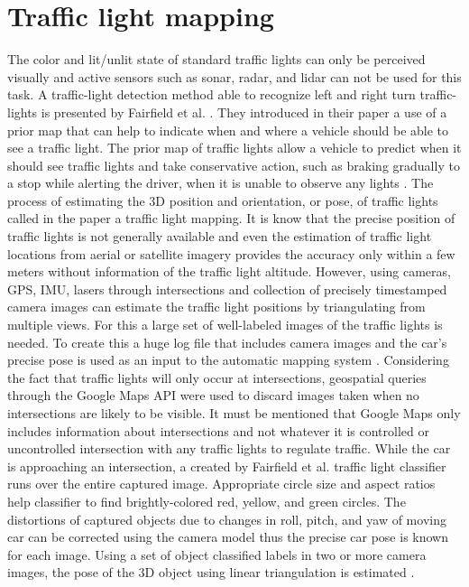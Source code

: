 \documentclass[letterpaper, 10 pt, conference]{ieeeconf} %
\begin{document}


\section{Traffic light mapping}
The color and lit/unlit state of standard traffic lights can only be perceived visually and active sensors such as sonar, radar, and lidar can not be used for this task. A traffic-light detection method able to recognize left and right turn traffic-lights is presented by Fairfield et al. \cite{c5}. They introduced in their paper a use of a prior map that can help to indicate when and where a vehicle should be able to see a traffic light. The prior map of traffic lights allow a vehicle to predict when it should see traffic lights and take conservative action, such as braking gradually to a stop while alerting the driver, when it is unable to observe any lights \cite{c5}. The process of estimating the 3D position and orientation, or pose, of traffic lights called in the paper a traffic light mapping. It is know that the precise position of traffic lights is not generally available and even the estimation of traffic light locations from aerial or satellite imagery provides the accuracy only within a few meters without information of the traffic light altitude. However, using cameras, GPS, IMU, lasers through intersections and collection of precisely timestamped camera images can estimate the traffic light positions by triangulating from multiple views. For this a large set of well-labeled images of the traffic lights is needed. To create this a huge log file that includes camera images and the car's precise pose is used as an input to the automatic mapping system \cite{c5}. Considering the fact that traffic lights will only occur at intersections, geospatial queries through the Google Maps API were used to discard images taken when no intersections are likely to be visible. It must be mentioned that Google Maps only includes information about intersections and not whatever it is controlled or uncontrolled intersection with any traffic lights to regulate traffic. While the car is approaching an intersection, a created by Fairfield et al. traffic light classifier runs over the entire captured image. Appropriate circle size and aspect ratios help classifier to find brightly-colored red, yellow, and green circles. The distortions of captured objects due to changes in roll, pitch, and yaw of moving car can be corrected using the camera model thus the precise car pose is known for each image. Using a set of object classified labels in two or more camera images, the pose of the 3D object using linear triangulation is estimated \cite{c5}.
\end{document}
